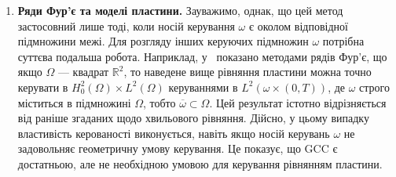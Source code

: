 \begin{enumerate}
\begin{enumerate}
Наприклад, для системи
\begin{equation}\label{eqIII75}
    \begin{cases}
    y^{\prime\prime} + \Delta^2 y = h \chi_\omega \hspace{1.6cm} & \text{в} \hspace{0.3cm} Q
    \\
    y = \partial y / \partial \nu = 0 \hspace{0.5cm} & \text{на} \hspace{0.3cm} \Sigma
    \\
    y(0) = y^0,\ y^\prime(0) = y^1 \hspace{0.5cm} & \text{в} \hspace{0.3cm} \Omega
    \end{cases}
\end{equation}
виконується таке: \emph{``Нехай $\Omega$ — обмежена область $\mathbb{R}^n$ з межею класу $C^3$ і $\omega$ — окіл підмножини межі типу $\overline{\Gamma(x^0)}$. Тоді для всіх $T>0$ і $\{y^0, y^1\} \in H^2_{0}(\Omega) \times L^2(\Omega)$ існує керування $h \in L^2(\omega \times (0,T))$ таке, що розв'язок~(\ref{eqIII75}) задовольняє~(\ref{eqIII02})''.}

Це аналог попереднього результату для хвильового рівняння, але цього разу він справджується за довільно малий час.

У~\cite{machtyngier1990control} техніки цього розділу адаптовано для дослідження внутрішньої керованості рівняння Шредінгера.

\item \textbf{Ряди Фур'є та моделі пластини.} Зауважимо, однак, що цей метод застосовний лише тоді, коли носій керування $\omega$ є околом відповідної підмножини межі. Для розгляду інших керуючих підмножин $\omega$ потрібна суттєва подальша робота. Наприклад, у~\cite{jaffard1988controle} показано методами рядів Фур'є, що якщо $\Omega$ — квадрат $\mathbb{R}^2$, то наведене вище рівняння пластини можна точно керувати в $H^2_{0}(\Omega) \times L^2(\Omega)$ керуваннями в $L^2(\omega \times (0,T))$, де $\omega$ строго міститься в підмножині $\Omega$, тобто $\overline{\omega} \subset \Omega$. Цей результат істотно відрізняється від раніше згаданих щодо хвильового рівняння. Дійсно, у цьому випадку властивість керованості виконується, навіть якщо носій керувань $\omega$ не задовольняє геометричну умову керування. Це показує, що GCC є достатньою, але не необхідною умовою для керування рівнянням пластини.
\end{enumerate}
\end{enumerate}

